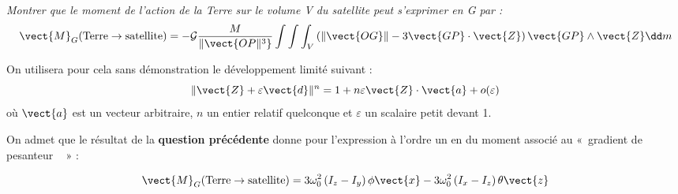 \fi

\question{\label{q_11}}\textit{ Montrer que le moment de l'action de la Terre sur le volume V du
  satellite peut s'exprimer en G par :}
$$
\vect{M}_G(\text{Terre}\to \text{satellite})=-\mathcal{G}\dfrac{M}{\Vert\vect{OP\Vert^3}}\int\int\int_V\left(\Vert\vect{OG}\Vert-3\vect{GP}\cdot\vect{Z}\right)\vect{GP}\wedge\vect{Z}\dd m
$$  
  
On utilisera pour cela sans démonstration le développement limité suivant :
  $$
  \Vert\vect{Z}+\varepsilon \vect{d} \Vert^n=1+n\varepsilon \vect{Z}\cdot \vect{a}+o(\varepsilon)
  $$
  où $\vect{a}$ est un vecteur arbitraire, $n$ un entier relatif quelconque et $\varepsilon$ un
  scalaire petit devant 1.
\ifprof
\begin{corrige}

\end{corrige}
\else
\fi


\ifprof
\else
On admet que le résultat de la \textbf{question précédente} donne pour
l'expression à l'ordre un en \triplet{\phi}{\theta}{\psi} du moment associé au «~gradient de
pesanteur ~ » :

$$
\vect{M}_G(\text{Terre}\to \text{satellite})=3\omega_0^2\left(I_z-I_y\right)\phi\vect{x}-3\omega_0^2\left(I_x-I_z\right)\theta\vect{z}
$$  

\fi


  
  
